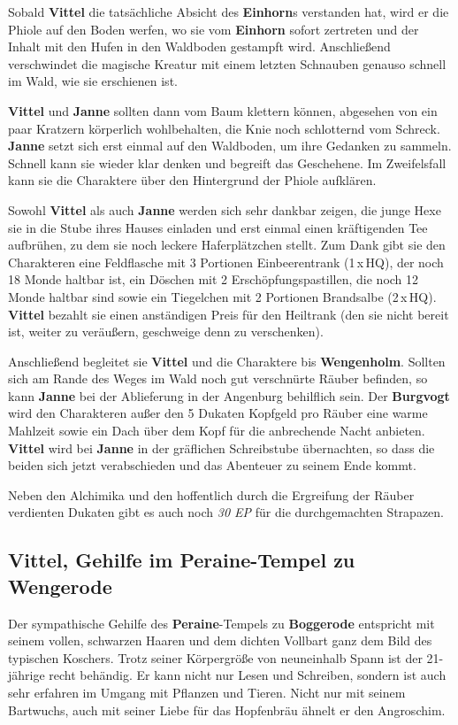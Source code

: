 Sobald \textbf{Vittel} die tatsächliche Absicht des \textbf{Einhorn}s verstanden hat, wird er die Phiole auf den Boden werfen, wo sie vom \textbf{Einhorn} sofort zertreten und der Inhalt mit den Hufen in den Waldboden gestampft wird.
Anschließend verschwindet die magische Kreatur mit einem letzten Schnauben genauso schnell im Wald, wie sie erschienen ist.


\textbf{Vittel} und \textbf{Janne} sollten dann vom Baum klettern können, abgesehen von ein paar Kratzern körperlich wohlbehalten, die Knie noch schlotternd vom Schreck.
\textbf{Janne} setzt sich erst einmal auf den Waldboden, um ihre Gedanken zu sammeln. Schnell kann sie wieder klar denken und begreift das Geschehene. Im Zweifelsfall kann sie die Charaktere über den Hintergrund der Phiole aufklären.

Sowohl \textbf{Vittel} als auch \textbf{Janne} werden sich sehr dankbar zeigen, die junge Hexe sie in die Stube ihres Hauses einladen und erst einmal einen kräftigenden Tee aufbrühen, zu dem sie noch leckere Haferplätzchen stellt.
Zum Dank gibt sie den Charakteren eine Feldflasche mit 3 Portionen Einbeerentrank (1\,x\,HQ), der noch 18 Monde haltbar ist, ein Döschen mit 2 Erschöpfungspastillen, die noch 12 Monde haltbar sind sowie ein Tiegelchen mit 2 Portionen Brandsalbe (2\,x\,HQ).
\textbf{Vittel} bezahlt sie einen anständigen Preis für den Heiltrank (den sie nicht bereit ist, weiter zu veräußern, geschweige denn zu verschenken).


Anschließend begleitet sie \textbf{Vittel} und die Charaktere bis \textbf{Wengenholm}.
Sollten sich am Rande des Weges im Wald noch gut verschnürte Räuber befinden, so kann \textbf{Janne} bei der Ablieferung in der Angenburg behilflich sein.
Der \textbf{Burgvogt} wird den Charakteren außer den 5 Dukaten Kopfgeld pro Räuber eine warme Mahlzeit sowie ein Dach über dem Kopf für die anbrechende Nacht anbieten.
\textbf{Vittel} wird bei \textbf{Janne} in der gräflichen Schreibstube übernachten, so dass die beiden sich jetzt verabschieden und das Abenteuer zu seinem Ende kommt. 

Neben den Alchimika und den hoffentlich durch die Ergreifung der Räuber verdienten Dukaten gibt es auch noch \textit{30 EP} für die durchgemachten Strapazen.

\neuespalte


\subsection[Vittel, Gehilfe im Peraine-Tempel]{Vittel, Gehilfe im Peraine-Tempel zu Wengerode}
Der sympathische Gehilfe des \textbf{Peraine}-Tempels zu \textbf{Boggerode} entspricht mit seinem vollen, schwarzen Haaren und dem dichten Vollbart ganz dem Bild des typischen Koschers.
Trotz seiner Körpergröße von neuneinhalb Spann ist der 21-jährige recht behändig.
Er kann nicht nur Lesen und Schreiben, sondern ist auch sehr erfahren im Umgang mit Pflanzen und Tieren.
Nicht nur mit seinem Bartwuchs, auch mit seiner Liebe für das Hopfenbräu ähnelt er den Angroschim.


